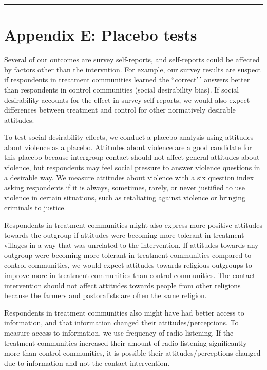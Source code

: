 \documentclass[
]{article}
\begin{document}
\begin{center}\rule{0.5\linewidth}{0.5pt}\end{center}

\newpage

\hypertarget{appendix-e-placebo-tests}{%
\section{Appendix E: Placebo tests}\label{appendix-e-placebo-tests}}

Several of our outcomes are survey self-reports, and self-reports could
be affected by factors other than the intervntion. For example, our
survey results are suspect if respondents in treatment communities
learned the ``correct'\,' answers better than respondents in control
communities (social desirability bias). If social desirability accounts
for the effect in survey self-reports, we would also expect differences
between treatment and control for other normatively desirable attitudes.

To test social desirability effects, we conduct a placebo analysis using
attitudes about violence as a placebo. Attitudes about violence are a
good candidate for this placebo because intergroup contact should not
affect general attitudes about violence, but respondents may feel social
pressure to answer violence questions in a desirable way. We measure
attitudes about violence with a six question index asking respondents if
it is always, sometimes, rarely, or never justified to use violence in
certain situations, such as retaliating against violence or bringing
criminals to justice.

Respondents in treatment communities might also express more positive
attitudes towards the outgroup if attitudes were becoming more tolerant
in treatment villages in a way that was unrelated to the intervention.
If attitudes towards any outgroup were becoming more tolerant in
treatment communities compared to control communities, we would expect
attitudes towards religious outgroups to improve more in treatment
communities than control communities. The contact intervention should
not affect attitudes towards people from other religions because the
farmers and pastoralists are often the same religion.

Respondents in treatment communities also might have had better access
to information, and that information changed their
attitudes/perceptions. To measure access to information, we use
frequency of radio listening. If the treatment communities increased
their amount of radio listening significantly more than control
communities, it is possible their attitudes/perceptions changed due to
information and not the contact intervention.
\end{document}

